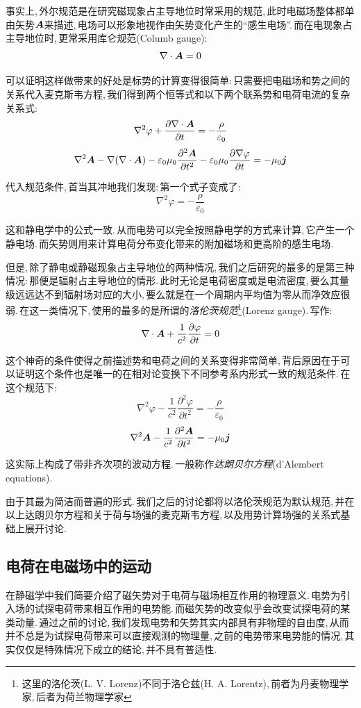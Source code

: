 事实上,\,外尔规范是在研究磁现象占主导地位时常采用的规范,\,此时电磁场整体都单由矢势$\boldsymbol{A}$来描述,\,电场可以形象地视作由矢势变化产生的``感生电场''.\,而在电现象占主导地位时,\,更常采用库仑规范(Columb gauge):
\[\nabla\cdot \boldsymbol{A}=0\]

可以证明这样做带来的好处是标势的计算变得很简单:\,只需要把电磁场和势之间的关系代入麦克斯韦方程,\,我们得到两个恒等式和以下两个联系势和电荷电流的复杂关系式:
\[\nabla^2\varphi+\frac{\partial\nabla\cdot\boldsymbol{A}}{\partial t}=-\frac{\rho}{\varepsilon_0}\]
\[\nabla^2\boldsymbol{A}-\nabla(\nabla\cdot\boldsymbol{A})-\varepsilon_0\mu_0\frac{\partial^2\boldsymbol{A}}{\partial t^2}-\varepsilon_0\mu_0\frac{\partial\nabla\varphi}{\partial t}=-\mu_0\boldsymbol{j}\]

代入规范条件,\,首当其冲地我们发现:\,第一个式子变成了:
\[\nabla^2\varphi=-\frac{\rho}{\varepsilon_0}\]

这和静电学中的公式一致.\,从而电势可以完全按照静电学的方式来计算,\,它产生一个静电场.\,而矢势则用来计算电荷分布变化带来的附加磁场和更高阶的感生电场.

但是,\,除了静电或静磁现象占主导地位的两种情况,\,我们之后研究的最多的是第三种情况:\,那便是辐射占主导地位的情形.\,此时无论是电荷密度或是电流密度,\,要么其量级远远达不到辐射场对应的大小,\,要么就是在一个周期内平均值为零从而净效应很弱.\,在这一类情况下,\,使用的最多的是所谓的\emph{洛伦茨规范}\footnote{这里的洛伦茨(L. V. Lorenz)不同于洛仑兹(H. A. Lorentz),\,前者为丹麦物理学家,\,后者为荷兰物理学家}(Lorenz gauge).\,写作:
\[\nabla\cdot\boldsymbol{A}+\frac{1}{c^2}\frac{\partial \varphi}{\partial t}=0\]

这个神奇的条件使得之前描述势和电荷之间的关系变得非常简单,\,背后原因在于可以证明这个条件也是唯一的在相对论变换下不同参考系内形式一致的规范条件.\,在这个规范下:
\[\nabla^2\varphi-\frac{1}{c^2}\frac{\partial^2\varphi}{\partial t^2}=-\frac{\rho}{\varepsilon_0}\]
\[\nabla^2\boldsymbol{A}-\frac{1}{c^2}\frac{\partial^2\boldsymbol{A}}{\partial t^2}=-\mu_0\boldsymbol{j}\]

这实际上构成了带非齐次项的波动方程.\,一般称作\emph{达朗贝尔方程}(d'Alembert equations).

由于其最为简洁而普遍的形式.\,我们之后的讨论都将以洛伦茨规范为默认规范,\,并在以上达朗贝尔方程和关于荷与场强的麦克斯韦方程,\,以及用势计算场强的关系式基础上展开讨论.



\subsection{电荷在电磁场中的运动}

在静磁学中我们简要介绍了磁矢势对于电荷与磁场相互作用的物理意义.\,电势为引入场的试探电荷带来相互作用的电势能.\,而磁矢势的改变似乎会改变试探电荷的某类动量.\,通过之前的讨论,\,我们发现电势和矢势其实内部具有非物理的自由度,\,从而并不总是为试探电荷带来可以直接观测的物理量,\,之前的电势带来电势能的情况,\,其实仅仅是特殊情况下成立的结论,\,并不具有普适性.


